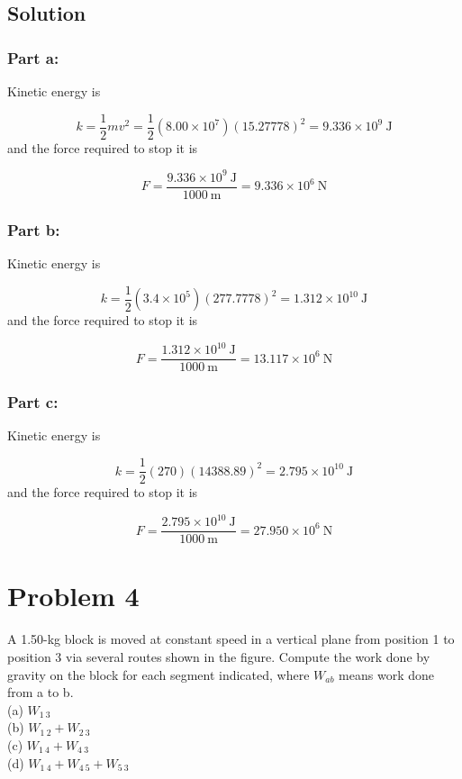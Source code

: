 \documentclass{article}
\begin{document}
\subsection*{Solution}
\subsubsection*{Part a:}
Kinetic energy is

\[
	k = \frac{1}{2} mv^2 = \frac{1}{2}(8.00 \times 10^7)(15.27778)^2 = \boxed{9.336\times10^{9}\ \text{J}}
\]
and the force required to stop it is

\[
	F = \frac{9.336\times10^{9}\ \text{J}}{1000\ \text{m}} = \boxed{9.336 \times 10^6\ \text{N}}
\]

\subsubsection*{Part b:}
Kinetic energy is

\[
	k = \frac{1}{2}(3.4 \times 10^5)(277.7778)^2 = \boxed{1.312\times10^{10}\ \text{J}}
\]
and the force required to stop it is

\[
	F = \frac{1.312\times10^{10}\ \text{J}}{1000\ \text{m}} = \boxed{13.117 \times 10^6\ \text{N}}
\]

\subsubsection*{Part c:}
Kinetic energy is

\[
	k = \frac{1}{2}(270)(14388.89)^2 = \boxed{2.795\times10^{10}\ \text{J}}
\]
and the force required to stop it is

\[
	F = \frac{2.795\times10^{10}\ \text{J}}{1000\ \text{m}} = \boxed{27.950 \times 10^6 \ \text{N}}
\]

\section*{Problem 4}
A 1.50-kg block is moved at constant speed in a vertical plane from position 1 to position 3 via several
routes shown in the figure. Compute the work done by gravity on the block for each segment indicated,
where $W_{ab}$ means work done from a to b. \\
(a) $W_{1\ 3}$ \\
(b) $W_{1\ 2} + W_{2\ 3}$ \\
(c) $W_{1\ 4} + W_{4\ 3}$ \\
(d) $W_{1\ 4} + W_{4\ 5} + W_{5\ 3}$
\end{document}
